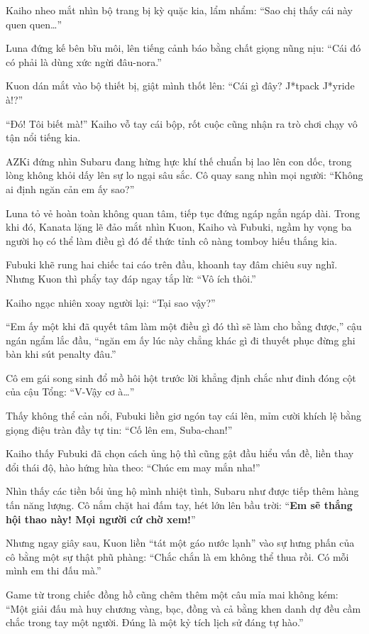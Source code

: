\documentclass[../main.tex]{subfiles}
\begin{document}

Kaiho nheo mắt nhìn bộ trang bị kỳ quặc kia, lẩm nhẩm: ``Sao chị thấy cái này quen quen\dots''

Luna đứng kế bên bĩu môi, lên tiếng cảnh báo bằng chất giọng nũng nịu: ``Cái đó có phải là dùng xức ngừi đâu-nora.''

Kuon dán mắt vào bộ thiết bị, giật mình thốt lên: ``Cái gì đây? J*tpack J*yride à!?''

``Đó! Tôi biết mà!'' Kaiho vỗ tay cái bộp, rốt cuộc cũng nhận ra trò chơi chạy vô tận nổi tiếng kia.

AZKi đứng nhìn Subaru đang hừng hực khí thế chuẩn bị lao lên con dốc, trong lòng không khỏi dấy lên sự lo ngại sâu sắc. Cô quay sang nhìn mọi người: ``Không ai định ngăn cản em ấy sao?''

Luna tỏ vẻ hoàn toàn không quan tâm, tiếp tục đứng ngáp ngắn ngáp dài. Trong khi đó, Kanata lặng lẽ đảo mắt nhìn Kuon, Kaiho và Fubuki, ngầm hy vọng ba người họ có thể làm điều gì đó để thức tỉnh cô nàng tomboy hiếu thắng kia.

Fubuki khẽ rung hai chiếc tai cáo trên đầu, khoanh tay đâm chiêu suy nghĩ. Nhưng Kuon thì phẩy tay đáp ngay tắp lừ: ``Vô ích thôi.''

Kaiho ngạc nhiên xoay người lại: ``Tại sao vậy?''

``Em ấy một khi đã quyết tâm làm một điều gì đó thì sẽ làm cho bằng được,'' cậu ngán ngẩm lắc đầu, ``ngăn em ấy lúc này chẳng khác gì đi thuyết phục đừng ghi bàn khi sút penalty đâu.''

Cô em gái song sinh đổ mồ hôi hột trước lời khẳng định chắc như đinh đóng cột của cậu Tổng: ``V-Vậy cơ à\dots''

Thấy không thể cản nổi, Fubuki liền giơ ngón tay cái lên, mỉm cười khích lệ bằng giọng điệu tràn đầy tự tin: ``Cố lên em, Suba-chan!''

Kaiho thấy Fubuki đã chọn cách ủng hộ thì cũng gật đầu hiểu vấn đề, liền thay đổi thái độ, hào hứng hùa theo: ``Chúc em may mắn nha!''

Nhìn thấy các tiền bối ủng hộ mình nhiệt tình, Subaru như được tiếp thêm hàng tấn năng lượng. Cô nắm chặt hai đấm tay, hét lớn lên bầu trời: ``\textbf{Em sẽ thắng hội thao này! Mọi người cứ chờ xem!}''

Nhưng ngay giây sau, Kuon liền ``tát một gáo nước lạnh'' vào sự hưng phấn của cô bằng một sự thật phũ phàng: ``Chắc chắn là em không thể thua rồi. Có mỗi mình em thi đấu mà.''

Game từ trong chiếc đồng hồ cũng chêm thêm một câu mỉa mai không kém: ``Một giải đấu mà huy chương vàng, bạc, đồng và cả bằng khen danh dự đều cầm chắc trong tay một người. Đúng là một kỷ tích lịch sử đáng tự hào.''
\end{document}
